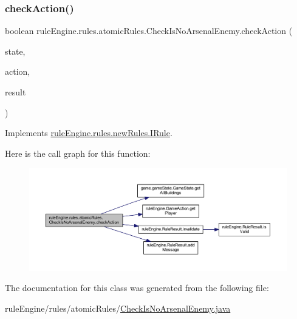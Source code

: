 \subsubsection{\texorpdfstring{check\+Action()}{checkAction()}}
{\footnotesize\ttfamily boolean rule\+Engine.\+rules.\+atomic\+Rules.\+Check\+Is\+No\+Arsenal\+Enemy.\+check\+Action (\begin{DoxyParamCaption}\item[{\mbox{\hyperlink{classgame_1_1game_state_1_1_game_state}{Game\+State}}}]{state,  }\item[{\mbox{\hyperlink{classrule_engine_1_1_game_action}{Game\+Action}}}]{action,  }\item[{\mbox{\hyperlink{classrule_engine_1_1_rule_result}{Rule\+Result}}}]{result }\end{DoxyParamCaption})\hspace{0.3cm}{\ttfamily [inline]}}



Implements \mbox{\hyperlink{interfacerule_engine_1_1rules_1_1new_rules_1_1_i_rule_a72ce29a47d7a5fba75a09444a50a481e}{rule\+Engine.\+rules.\+new\+Rules.\+I\+Rule}}.

Here is the call graph for this function\+:
\nopagebreak
\begin{figure}[H]
\begin{center}
\leavevmode
\includegraphics[width=350pt]{classrule_engine_1_1rules_1_1atomic_rules_1_1_check_is_no_arsenal_enemy_af7f0d5a6d8ca7be75585b03342fcd3a9_cgraph}
\end{center}
\end{figure}


The documentation for this class was generated from the following file\+:\begin{DoxyCompactItemize}
\item 
rule\+Engine/rules/atomic\+Rules/\mbox{\hyperlink{_check_is_no_arsenal_enemy_8java}{Check\+Is\+No\+Arsenal\+Enemy.\+java}}\end{DoxyCompactItemize}
